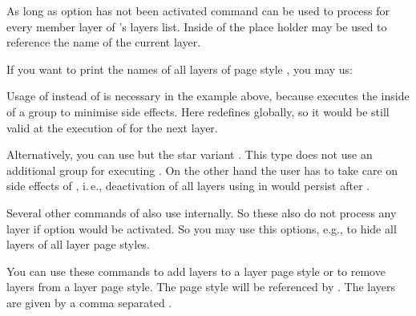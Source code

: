 \begin{Declaration}
\end{Declaration}
As long as \KOMAScript{} option  has not
been activated command  can be used to process
 for every member layer of 's layers
list. Inside of  the place holder  may be used to
reference the name of the current layer.
\begin{Example}
  If you want to print the names of all layers of page style
  , you may us:
\begin{lstcode}
  \let\commaatlist\empty
  \ForEachLayerOfPageStyle{scrheadings}{%
    \commaatlist#1\gdef\commaatlist{, }}
\end{lstcode}
\end{Example}
Usage of  instead of  is necessary in the example
above, because  executes the 
inside of a group to minimise side effects. Here  redefines
 globally, so it would be still valid at the execution of
 for the next layer.

Alternatively, you can use 
but the star variant . This type does not use
an additional group for executing . On the other hand the user has
to take care on side effects of , i.\,e., deactivation of all
layers using  in 
would persist after .

Several other commands of  also
use  internally. So these also do not process
any layer if \KOMAScript{} option  would be
activated. So you may use this options, e.g., to hide all layers of all layer
page styles.%
\EndIndexGroup


\begin{Declaration}
\end{Declaration}
You can use these commands to add layers to a layer page style or to remove 
layers from a layer page style. The page style will be referenced by
. The layers are given by a comma separated
. 

